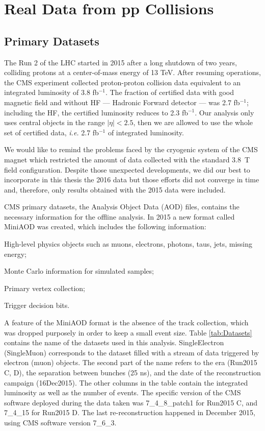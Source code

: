 \chapter{Real Data from pp Collisions}
\label{ch:realdata}

\section{Primary Datasets}
The Run 2 of the LHC started in 2015 after a long shutdown of two years, colliding protons at a center-of-mass energy of 13 TeV. After resuming operations, the CMS experiment collected proton-proton collision data equivalent to an integrated luminosity of 3.8 fb$^{-1}$. The fraction of certified data with good magnetic field and without HF --- Hadronic Forward detector --- was 2.7 fb$^{-1}$; including the HF, the certified luminosity reduces to 2.3 fb$^{-1}$. Our analysis only uses central objects in the range $|\eta|<2.5$, then we are allowed to use the whole set of certified data, {\it i.e.} 2.7 fb$^{-1}$ of integrated luminosity.

We would like to remind the problems faced by the cryogenic system of the CMS magnet which restricted the amount of data collected with the standard 3.8~T field configuration. Despite those unexpected developments, we did our best to incorporate in this thesis the 2016 data but those efforts did not converge in time and, therefore, only results obtained with the 2015 data were included.

CMS primary datasets, the Analysis Object Data (AOD) files, contains the necessary information for the offline analysis. In 2015 a new format called MiniAOD \cite{miniAODtwiki} was created, which includes the following information:
\begin{compact_itemize}
\item High-level physics objects such as muons, electrons, photons, taus, jets, missing energy;
\item Monte Carlo information for simulated samples;
\item Primary vertex collection;
\item Trigger decision bits.
\end{compact_itemize}

A feature of the MiniAOD format is the absence of the track collection, which was dropped purposely in order to keep a small event size. Table \ref{tab:Datasets} contains the name of the datasets used in this analysis.  SingleElectron (SingleMuon) corresponds to the dataset filled with a stream of data triggered by electron (muon) objects. The second part of the name refers to the era (Run2015 C, D), the separation between bunches (25 ns), and the date of the reconstruction campaign (16Dec2015). The other columns in the table contain the integrated luminosity as well as the number of events. The specific version of the CMS software deployed during the data taken was 7\_4\_8\_patch1 for Run2015 C, and 7\_4\_15 for Run2015 D. The last re-reconstruction happened in December 2015, using CMS software version 7\_6\_3.

